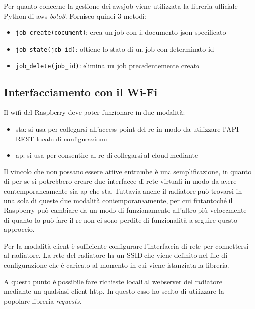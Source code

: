 \documentclass[12pt,a4paper,twoside,titlepage]{book}
\begin{document}
Per quanto concerne la gestione dei \Gls{awsjob} viene utilizzata la libreria ufficiale Python di \acrshort{aws}
\textit{boto3}. Fornisco quindi 3 metodi:
\begin{itemize}
    \item \texttt{job\_create(document)}: crea un job con il documento \acrshort{json} specificato
    \item \texttt{job\_state(job\_id)}: ottiene lo stato di un job con determinato id
    \item \texttt{job\_delete(job\_id)}: elimina un job precedentemente creato
\end{itemize}

\subsection{Interfacciamento con il Wi-Fi}

Il \Gls{wifi} del Raspberry deve poter funzionare in due modalità:
\begin{itemize}
    \item \acrfull{sta}: si usa per collegarsi all'access point del \acrshort{re} in modo da 
        utilizzare l'API REST locale di configurazione
    \item \acrfull{ap}: si usa per consentire al \acrshort{re} di collegarsi al cloud mediante
\end{itemize}

Il vincolo che non possano essere attive entrambe è una semplificazione, in quanto di per 
se si potrebbero creare due interfacce di rete virtuali in modo da avere contemporaneamente sia 
\acrshort{ap} che \acrshort{sta}. Tuttavia anche il radiatore può trovarsi in una sola di 
queste due modalità contemporaneamente, per cui fintantoché il Raspberry può cambiare da un modo 
di funzionamento all'altro più velocemente di quanto lo può fare il \acrshort{re} non ci sono 
perdite di funzionalità a seguire questo approccio. 

Per la modalità client è sufficiente configurare l'interfaccia di rete per connettersi
al radiatore. La rete del radiatore ha un SSID che viene definito nel file di configurazione 
che è caricato al momento in cui viene istanziata la libreria. 

A questo punto è possibile fare richieste locali al webserver del radiatore mediante
un qualsiasi client \acrshort{http}. In questo caso ho scelto di utilizzare la popolare
libreria \textit{requests}.
\end{document}
